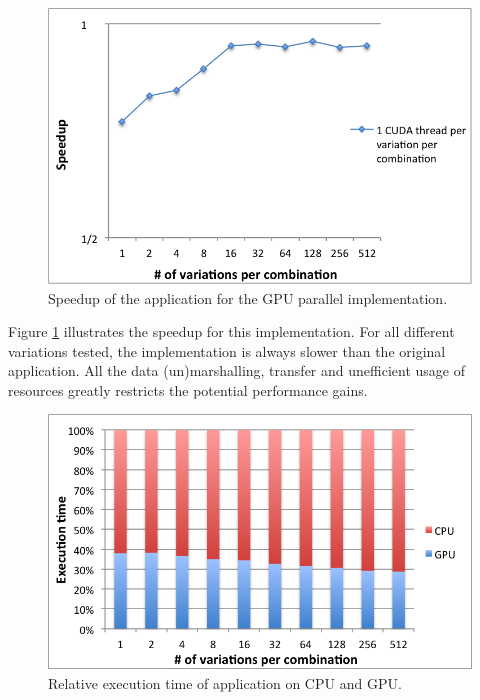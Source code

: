 \begin{figure}[!htp]
	\begin{center}
		\includegraphics[scale=0.7]{../../common/graphs/speedup_gpu.png}
		\caption{Speedup of the \tth application for the GPU parallel implementation.}
		\label{fig:GPUSpeedup}
	\end{center}
\end{figure}

Figure \ref{fig:GPUSpeedup} illustrates the speedup for this implementation. For all different variations tested, the implementation is always slower than the original application. All the data (un)marshalling, transfer and unefficient usage of resources greatly restricts the potential performance gains.

\begin{figure}[!htp]
	\begin{center}
		\includegraphics[scale=0.7]{../../common/graphs/percentage_time_gpu.png}
		\caption{Relative execution time of \tth application on CPU and GPU.}
		\label{fig:GPUPercentage}
	\end{center}
\end{figure}

